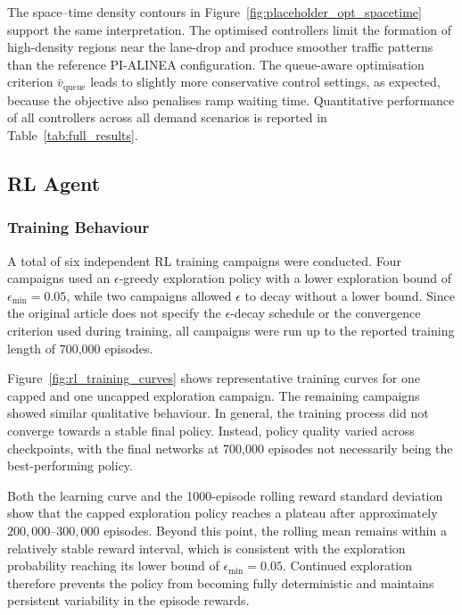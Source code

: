 The space--time density contours in
Figure~\ref{fig:placeholder_opt_spacetime} support the same interpretation. The
optimised controllers limit the formation of high-density regions near the
lane-drop and produce smoother traffic patterns than the reference PI-ALINEA
configuration. The queue-aware optimisation criterion
\(\bar{v}_{\mathrm{queue}}\) leads to slightly more conservative control
settings, as expected, because the objective also penalises ramp waiting time.
Quantitative performance of all controllers across all demand scenarios is reported in
Table~\ref{tab:full_results}. 


\subsection{RL Agent}\label{subsec:RL}

\subsubsection{Training Behaviour}

A total of six independent RL training campaigns were conducted. Four campaigns
used an \(\epsilon\)-greedy exploration policy with a lower exploration bound of
\(\epsilon_{\min}=0.05\), while two campaigns allowed \(\epsilon\) to decay
without a lower bound. Since the original article does not specify the
\(\epsilon\)-decay schedule or the convergence criterion used during training,
all campaigns were run up to the reported training length of 700,000 episodes.

Figure~\ref{fig:rl_training_curves} shows representative training curves for
one capped and one uncapped exploration campaign. The remaining campaigns
showed similar qualitative behaviour. In general, the training process did not converge towards a stable final policy. Instead,
policy quality varied across checkpoints, with the final networks at
700,000 episodes not necessarily being the best-performing policy.

Both the learning curve and the 1000-episode rolling reward standard deviation show that the capped exploration policy reaches a plateau
after approximately \(200{,}000\)--\(300{,}000\) episodes. Beyond this point,
the rolling mean remains within a relatively stable reward interval, which is
consistent with the exploration probability reaching its lower bound of
\(\epsilon_{\min}=0.05\). Continued exploration therefore prevents the policy
from becoming fully deterministic and maintains persistent variability in the
episode rewards.

